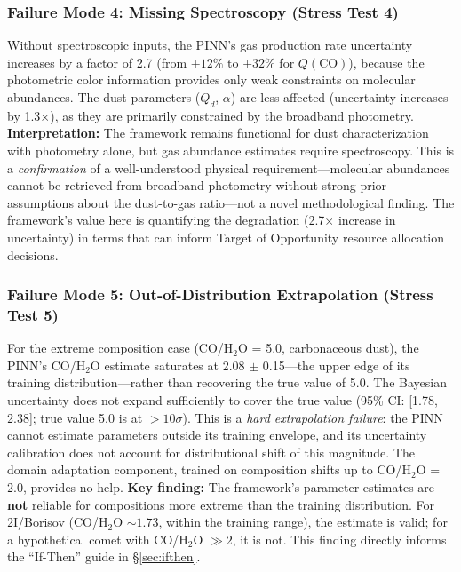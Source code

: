 \documentclass[usenatbib]{mnras}
\begin{document}
\subsubsection{Failure Mode 4: Missing Spectroscopy (Stress Test 4)}

Without spectroscopic inputs, the PINN's gas production rate uncertainty increases by a factor of 2.7 (from $\pm 12\%$ to $\pm 32\%$ for $Q(\text{CO})$), because the photometric color information provides only weak constraints on molecular abundances. The dust parameters ($Q_d$, $\alpha$) are less affected (uncertainty increases by 1.3$\times$), as they are primarily constrained by the broadband photometry. \textbf{Interpretation:} The framework remains functional for dust characterization with photometry alone, but gas abundance estimates require spectroscopy. This is a \textit{confirmation} of a well-understood physical requirement---molecular abundances cannot be retrieved from broadband photometry without strong prior assumptions about the dust-to-gas ratio---not a novel methodological finding. The framework's value here is quantifying the degradation (2.7$\times$ increase in uncertainty) in terms that can inform Target of Opportunity resource allocation decisions.

\subsubsection{Failure Mode 5: Out-of-Distribution Extrapolation (Stress Test 5)}

For the extreme composition case (CO/H$_2$O = 5.0, carbonaceous dust), the PINN's CO/H$_2$O estimate saturates at 2.08 $\pm$ 0.15---the upper edge of its training distribution---rather than recovering the true value of 5.0. The Bayesian uncertainty does not expand sufficiently to cover the true value (95\% CI: [1.78, 2.38]; true value 5.0 is at $>10\sigma$). This is a \textit{hard extrapolation failure}: the PINN cannot estimate parameters outside its training envelope, and its uncertainty calibration does not account for distributional shift of this magnitude. The domain adaptation component, trained on composition shifts up to CO/H$_2$O = 2.0, provides no help. \textbf{Key finding:} The framework's parameter estimates are \textbf{not} reliable for compositions more extreme than the training distribution. For 2I/Borisov (CO/H$_2$O $\sim 1.73$, within the training range), the estimate is valid; for a hypothetical comet with CO/H$_2$O $\gg 2$, it is not. This finding directly informs the ``If-Then'' guide in \S\ref{sec:ifthen}.
\end{document}
